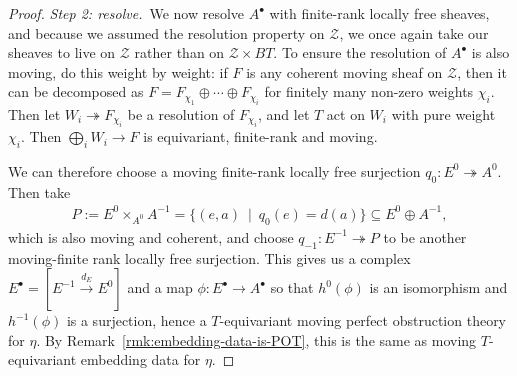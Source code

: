 \begin{proof}
  \bigskip
  
  \noindent\emph{Step 2: resolve.}~We now resolve \(A^\bullet\) with finite-rank locally free sheaves, and because we assumed the resolution property on \(\mathcal Z\), we once again take our sheaves to live on \(\mathcal Z\) rather than on \(\mathcal Z\times BT\). To ensure the resolution of \(A^\bullet\) is also moving, do this weight by weight: if \(F\) is any coherent moving sheaf on \(\mathcal Z\), then it can be decomposed as \(F = F_{\chi_1}\oplus \cdots \oplus F_{\chi_i}\) for finitely many non-zero weights \(\chi_i\). Then let \(W_i\twoheadrightarrow F_{\chi_i}\) be a resolution of \(F_{\chi_i}\), and let \(T\) act on \(W_i\) with pure weight \(\chi_i\). Then \(\bigoplus_i W_i\to F\) is equivariant, finite-rank and moving.

  We can therefore choose a moving finite-rank locally free surjection \(q_0:E^0\twoheadrightarrow A^0\). Then take
  \begin{align*}
    P := E^0\times_{A^0}A^{-1} = \{(e,a)~\mid~q_0(e) = d(a)\} \subseteq E^0\oplus A^{-1},
  \end{align*}
  which is also moving and coherent, and choose \(q_{-1}:E^{-1}\twoheadrightarrow P\) to be another moving-finite rank locally free surjection. This gives us a complex \(E^\bullet = [E^{-1}\xrightarrow{d_E} E^0]\) and a map \(\phi:E^\bullet \to A^\bullet\) so that \(h^0(\phi)\) is an isomorphism and \(h^{-1}(\phi)\) is a surjection, hence a $T$-equivariant moving perfect obstruction theory for \(\eta\). By Remark~\ref{rmk:embedding-data-is-POT}, this is the same as moving \(T\)-equivariant embedding data for \(\eta\).

\end{proof}
